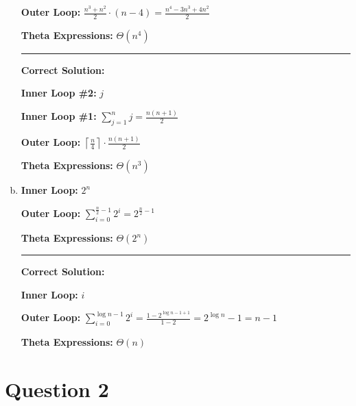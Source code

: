 \documentclass[12pt]{article}
\begin{document}
\begin{enumerate}[a.]
    \textbf{Outer Loop:} $\displaystyle\frac{n^3 + n^2}{2} \cdot (n - 4) = \displaystyle\frac{n^4 - 3n^3 + 4n^2}{2}$

    \textbf{Theta Expressions:} $\Theta (n^4)$

    \noindent\rule{\textwidth}{1pt}

    \textbf{Correct Solution:}

    \bigskip

    \textbf{Inner Loop \#2:} $j$

    \textbf{Inner Loop \#1:} $\sum\limits_{j=1}^n j = \displaystyle\frac{n(n+1)}{2}$

    \textbf{Outer Loop:} $\left\lceil \displaystyle\frac{n}{4} \right\rceil \cdot \displaystyle\frac{n(n+1)}{2}$

    \textbf{Theta Expressions:} $\Theta (n^3)$
    \item

    \textbf{Inner Loop:} $2^n$

    \textbf{Outer Loop:} $\displaystyle\sum\limits_{i=0}^{\frac{n}{2} - 1} 2^i = 2^{\frac{n}{2} - 1}$

    \textbf{Theta Expressions:} $\Theta (2^n)$

    \noindent\rule{\textwidth}{1pt}

    \textbf{Correct Solution:}

    \bigskip

    \textbf{Inner Loop:} $i$

    \textbf{Outer Loop:} $\sum\limits_{i=0}^{\log n - 1} 2^i = \displaystyle\frac{1 - 2^{\log n - 1 + 1}}{1 - 2} = 2^{\log n} - 1 = n - 1$

    \textbf{Theta Expressions:} $\Theta (n)$


\end{enumerate}

\section*{Question 2}
\end{document}
